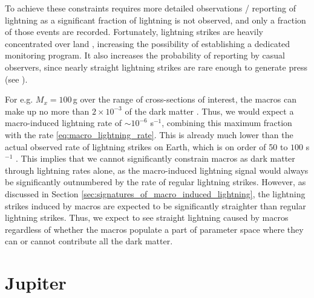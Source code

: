 \documentclass[%
 reprint,
 amsmath,amssymb,
 aps,
]{revtex4-2}
\newcommand{\vtwo}[1]{{\color{red} #1}}
\begin{document}
        To achieve these constraints requires more detailed observations / reporting of lightning as a significant fraction of lightning is not observed, and only a fraction of those events are recorded. Fortunately, lightning strikes are heavily concentrated over land \vtwo{\citep{Christian2003}}, increasing the possibility of establishing a dedicated monitoring program. It also increases the probability of reporting by casual observers, since nearly straight lightning strikes are rare enough to generate press (see \vtwo{\citet{Zimbabwe}}).

        For e.g. $M_x = 100\,$g over the range of cross-sections of interest, the macros can make up no more than $2\times 10^{-3}$ of the dark matter \vtwo{\citep{Sidhu2019death}}. Thus, we would expect a macro-induced lightning rate of $\sim 10^{-6}$ s$^{-1}$, combining this maximum fraction with the rate \eqref{eq:macro_lightning_rate}. This is already much lower than the actual observed rate of lightning strikes on Earth, which is on order of 50 to $100$ s$^{-1}$ \vtwo{\citep{Mackerras1998}}. This implies that we cannot significantly constrain macros as dark matter through lightning rates alone, as the macro-induced lightning signal would always be significantly outnumbered by the rate of regular lightning strikes. However, as discussed in Section \ref{sec:signatures_of_macro_induced_lightning}, the lightning strikes induced by macros are expected to be significantly straighter than regular lightning strikes. Thus, we expect to see straight lightning caused by macros regardless of whether the macros populate a part of parameter space where they can or cannot contribute all the dark matter.

    


\section{Jupiter} %
\label{sec:jovian_bolides}
\end{document}
